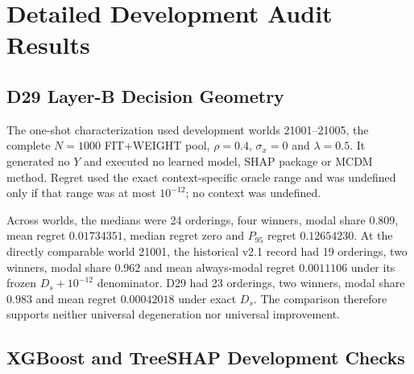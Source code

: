 \documentclass[runningheads,orivec]{llncs}
\begin{document}
\section{Detailed Development Audit Results}

\subsection{D29 Layer-B Decision Geometry}

The one-shot characterization used development worlds 21001--21005, the complete $N=1000$
FIT+WEIGHT pool, $\rho=0.4$, $\sigma_x=0$ and $\lambda=0.5$. It generated no $Y$ and executed
no learned model, SHAP package or MCDM method. Regret used the exact context-specific oracle
range and was undefined only if that range was at most $10^{-12}$; no context was undefined.

\begin{table}[t]
\centering
\caption{Complete frozen D29 Layer-B development record.}
\label{supp:tab:d29layerb}
\scriptsize
{}
\end{table}

Across worlds, the medians were 24 orderings, four winners, modal share $0.809$, mean regret
$0.01734351$, median regret zero and $P_{95}$ regret $0.12654230$. At the directly comparable
world 21001, the historical v2.1 record had 19 orderings, two winners, modal share $0.962$ and
mean always-modal regret $0.0011106$ under its frozen $D_s+10^{-12}$ denominator. D29 had 23
orderings, two winners, modal share $0.983$ and mean regret $0.00042018$ under exact $D_s$.
The comparison therefore supports neither universal degeneration nor universal improvement.

\subsection{XGBoost and TreeSHAP Development Checks}
\end{document}
